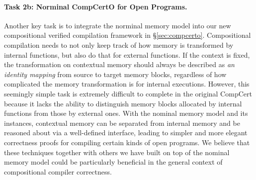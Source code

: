\paragraph*{Task 2b: Norminal CompCertO for Open Programs.}
Another key task is to integrate the norminal memory model into our
new compositional verified compilation framework in
\S\ref{sec:compcerto}.  Compositional compilation needs to not only
keep track of how memory is transformed by internal functions, but
also do that for external functions.  If the context is fixed, the
transformation on contextual memory should always be described as
\emph{an identity mapping} from source to target memory blocks,
regardless of how complicated the memory transformation is for
internal executions.  However, this seemingly simple task is extremely
difficult to complete in the original CompCert because it lacks the
ability to distinguish memory blocks allocated by internal functions
from those by external ones. With the nominal memory model and its
instances, contextual memory can be separated from internal memory and
be reasoned about via a well-defined interface, leading to simpler and
more elegant correctness proofs for compiling certain kinds of open
programs. We believe that these techniques together with others we
have built on top of the nominal memory model could be particularly
beneficial in the general context of compositional compiler
correctness.


